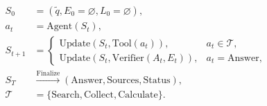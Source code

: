 \documentclass[border=4pt]{standalone}
\begin{document}
$\displaystyle
\begin{aligned}
S_0&=(\tilde q,E_0=\varnothing,L_0=\varnothing),\\
a_t&=\mathrm{Agent}(S_t),\\
S_{t+1}&=
\begin{cases}
\mathrm{Update}(S_t,\mathrm{Tool}(a_t)),&a_t\in\mathcal T,\\
\mathrm{Update}(S_t,\mathrm{Verifier}(A_t,E_t)),&a_t=\mathrm{Answer},
\end{cases}\\
S_T&\xrightarrow{\mathrm{Finalize}}(\mathrm{Answer},\mathrm{Sources},\mathrm{Status}),\\
\mathcal T&=\{\mathrm{Search},\mathrm{Collect},\mathrm{Calculate}\}.
\end{aligned}
$
\end{document}
